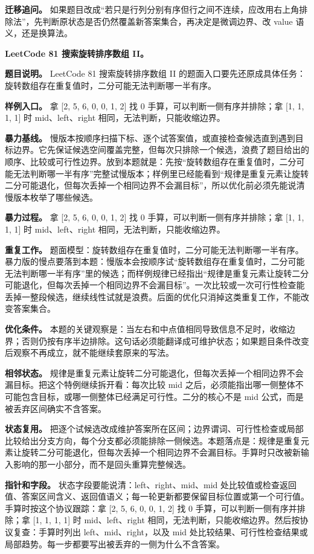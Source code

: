 \textbf{迁移追问。} 如果题目改成“若只是行列分别有序但行之间不连续，应改用右上角排除法”，先判断原状态是否仍然覆盖新答案集合，再决定是微调边界、改 value 语义，还是换算法。

\noindent\textbf{LeetCode 81 搜索旋转排序数组 II。}

\textbf{题目说明。} LeetCode 81 搜索旋转排序数组 II 的题面入口要先还原成具体任务：旋转数组存在重复值时，二分可能无法判断哪一半有序。

\textbf{样例入口。} 拿 [2, 5, 6, 0, 0, 1, 2] 找 0 手算，可以判断一侧有序并排除；拿 [1, 1, 1, 1] 时 mid、left、right 相同，无法判断，只能收缩边界。

\textbf{暴力基线。} 慢版本按顺序扫描下标、逐个试答案值，或直接检查候选直到遇到目标边界。它先保证候选空间覆盖完整，但每次只排除一个候选，浪费了题目给出的顺序、比较或可行性边界。放到本题就是：先按“旋转数组存在重复值时，二分可能无法判断哪一半有序”完整试慢版本；样例里已经能看到“规律是重复元素让旋转二分可能退化，但每次丢掉一个相同边界不会漏目标”，所以优化前必须先能说清慢版本枚举了哪些候选。

\textbf{暴力过程。} 拿 [2, 5, 6, 0, 0, 1, 2] 找 0 手算，可以判断一侧有序并排除；拿 [1, 1, 1, 1] 时 mid、left、right 相同，无法判断，只能收缩边界。

\textbf{重复工作。} 题面模型：旋转数组存在重复值时，二分可能无法判断哪一半有序。暴力版的慢点要落到本题：慢版本会按顺序试“旋转数组存在重复值时，二分可能无法判断哪一半有序”里的候选；而样例规律已经指出“规律是重复元素让旋转二分可能退化，但每次丢掉一个相同边界不会漏目标”。一次比较或一次可行性检查能丢掉一整段候选，继续线性试就是浪费。后面的优化只消掉这类重复工作，不能改变答案集合。

\textbf{优化条件。} 本题的关键观察是：当左右和中点值相同导致信息不足时，收缩边界；否则仍按有序半边排除。这句话必须能翻译成可维护状态；如果题目条件改变后观察不再成立，就不能继续套原来的写法。

\textbf{相邻状态。} 规律是重复元素让旋转二分可能退化，但每次丢掉一个相同边界不会漏目标。把这个特例继续拆开看：每次比较 mid 之后，必须能指出哪一侧整体不可能包含目标，或哪一侧整体已经满足可行性。二分的核心不是 mid 公式，而是被丢弃区间确实不含答案。

\textbf{状态复用。} 把逐个试候选改成维护答案所在区间；边界谓词、可行性检查或局部比较给出分支方向，每个分支都必须能排除一侧候选。本题落点是：规律是重复元素让旋转二分可能退化，但每次丢掉一个相同边界不会漏目标。手算时只改被新输入影响的那一小部分，而不是回头重算完整候选。

\textbf{指针和字段。} 状态字段要能说清：left、right、mid、mid 处比较值或检查返回值、答案区间含义、返回值语义；每一轮更新都要保留目标位置或第一个可行值。手算时按这个协议跟踪：拿 [2, 5, 6, 0, 0, 1, 2] 找 0 手算，可以判断一侧有序并排除；拿 [1, 1, 1, 1] 时 mid、left、right 相同，无法判断，只能收缩边界。然后按协议复查：手算时列出 left、mid、right，以及 mid 处比较结果、可行性检查结果或局部趋势。每一步都要写出被丢弃的一侧为什么不含答案。

